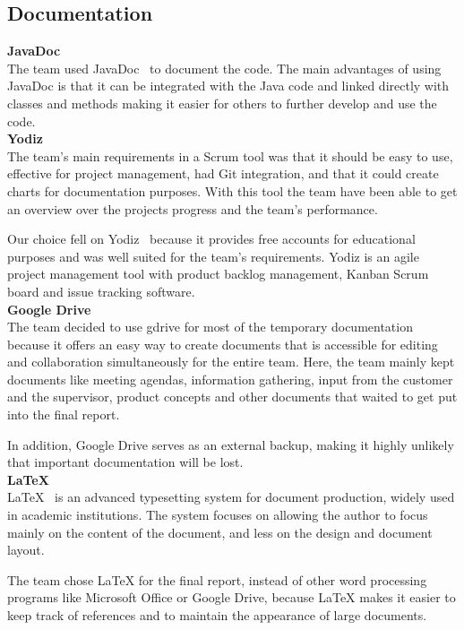 \subsection{Documentation}

\noindent\textbf{JavaDoc}\\
The team used JavaDoc~\cite{javadoc} to document the code. The main advantages of using JavaDoc is that it can be integrated with the Java code and linked directly with classes and methods making it easier for others to further develop and use the code.\\

\noindent\textbf{Yodiz}\\
The team's main requirements in a Scrum tool was that it should be easy to use, effective for project management, had Git integration, and that it could create charts for documentation purposes. With this tool the team have been able to get an overview over the projects progress and the team's performance. 

Our choice fell on Yodiz~\cite{yodiz} because it provides free accounts for educational purposes and was well suited for the team's requirements. Yodiz is an agile project management tool with product backlog management, Kanban Scrum board and issue tracking software.\\

\noindent\textbf{Google Drive}\\
The team decided to use \gls{gdrive} for most of the temporary documentation because it offers an easy way to create documents that is accessible for editing and collaboration simultaneously for the entire team. Here, the team mainly kept documents like meeting agendas, information gathering, input from the customer and the supervisor, product concepts and other documents that waited to get put into the final report. 

In addition, Google Drive serves as an external backup, making it highly unlikely that important documentation will be lost. \\


\noindent\textbf{\LaTeX}\\
LaTeX~\cite{latex} is an advanced typesetting system for document production, widely used in
academic institutions. The system focuses on allowing the author to focus mainly on the content of the document, and less on the design and document layout.

The team chose LaTeX for the final report, instead of other word processing programs like Microsoft Office or Google Drive, because LaTeX makes it easier to keep track of references and to maintain the appearance of large
documents. 

